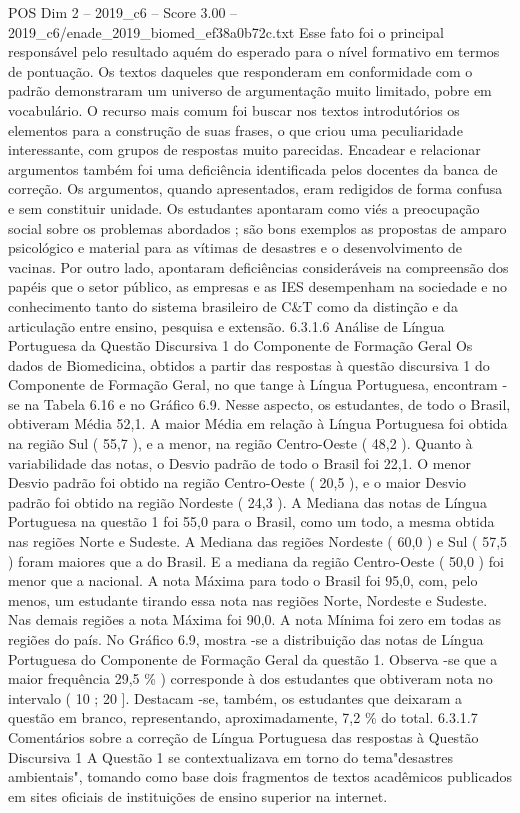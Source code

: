 \begin{textsample}{POS Dim 2 – 2019\_c6 – Score 3.00 – 2019\_c6/enade\_2019\_biomed\_ef38a0b72c.txt}
Esse fato foi o principal responsável pelo resultado aquém do esperado para o nível formativo em termos de pontuação.
Os textos daqueles que responderam em conformidade com o padrão demonstraram um universo de argumentação muito limitado, pobre em vocabulário.
O recurso mais comum foi buscar nos textos introdutórios os elementos para a construção de suas frases, o que criou uma peculiaridade interessante, com grupos de respostas muito parecidas.
Encadear e relacionar argumentos também foi uma deficiência identificada pelos docentes da banca de correção.
Os argumentos, quando apresentados, eram redigidos de forma confusa e sem constituir unidade.
Os estudantes apontaram como viés a preocupação social sobre os problemas abordados ; são bons exemplos as propostas de amparo psicológico e material para as vítimas de desastres e o desenvolvimento de vacinas.
Por outro lado, apontaram deficiências consideráveis na compreensão dos papéis que o setor público, as empresas e as IES desempenham na sociedade e no conhecimento tanto do sistema brasileiro de C\&T como da distinção e da articulação entre ensino, pesquisa e extensão. 6.3.1.6 Análise de Língua Portuguesa da Questão Discursiva 1 do Componente de Formação Geral Os dados de Biomedicina, obtidos a partir das respostas à questão discursiva 1 do Componente de Formação Geral, no que tange à Língua Portuguesa, encontram -se na Tabela 6.16 e no Gráfico 6.9.
Nesse aspecto, os estudantes, de todo o Brasil, obtiveram Média 52,1.
A maior Média em relação à Língua Portuguesa foi obtida na região Sul ( 55,7 ), e a menor, na região Centro-Oeste ( 48,2 ).
Quanto à variabilidade das notas, o Desvio padrão de todo o Brasil foi 22,1.
O menor Desvio padrão foi obtido na região Centro-Oeste ( 20,5 ), e o maior Desvio padrão foi obtido na região Nordeste ( 24,3 ).
A Mediana das notas de Língua Portuguesa na questão 1 foi 55,0 para o Brasil, como um todo, a mesma obtida nas regiões Norte e Sudeste.
A Mediana das regiões Nordeste ( 60,0 ) e Sul ( 57,5 ) foram maiores que a do Brasil.
E a mediana da região Centro-Oeste ( 50,0 ) foi menor que a nacional.
A nota Máxima para todo o Brasil foi 95,0, com, pelo menos, um estudante tirando essa nota nas regiões Norte, Nordeste e Sudeste.
Nas demais regiões a nota Máxima foi 90,0.
A nota Mínima foi zero em todas as regiões do país.
No Gráfico 6.9, mostra -se a distribuição das notas de Língua Portuguesa do Componente de Formação Geral da questão 1.
Observa -se que a maior frequência 29,5 \% ) corresponde à dos estudantes que obtiveram nota no intervalo ( 10 ; 20 ].
Destacam -se, também, os estudantes que deixaram a questão em branco, representando, aproximadamente, 7,2 \% do total. 6.3.1.7 Comentários sobre a correção de Língua Portuguesa das respostas à Questão Discursiva 1 A Questão 1 se contextualizava em torno do tema"desastres ambientais", tomando como base dois fragmentos de textos acadêmicos publicados em sites oficiais de instituições de ensino superior na internet.

\end{textsample}
